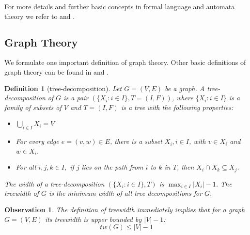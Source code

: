 \documentclass[]{article}
\newtheorem{definition}[theorem]{Definition}
\newtheorem{observation}[theorem]{Observation}
\numberwithin{equation}{section}
\begin{document}
For more details and further basic concepts in formal language and automata theory we refer to \cite{HMU06} and \cite{Sch08}.

\subsection{Graph Theory}
\label{sec:def:graph}

We formulate one important definition of graph theory. Other basic definitions of graph theory can be found in \cite{KN12} and \cite{Die06}.

\begin{definition}[tree-decomposition]
	\label{def:treedecomp}
	Let $G = (V,E)$ be a graph. A tree-decomposition of $G$ is a pair $(\{X_i : i \in I\}, T = (I,F))$, where $\{X_i : i \in I\}$ is a family of subsets of $V$ and $T = (I,F)$ is a tree with the following properties:
	\begin{itemize}
		\item[(i)] $\bigcup_{i \in I} X_i = V$
		\item[(ii)] For every edge $e = (v,w) \in E$, there is a subset $X_i, i \in I$, with $v	\in X_i$ and $w \in X_i$.
		\item[(iii)] For all $i, j, k \in I,$ if $j$ lies on the path from $i$ to $k$ in $T$, then $X_i\cap X_k \subseteq X_j$.
	\end{itemize}
	The width of a tree-decomposition $(\{X_i : i \in I\}, T)$ is $\max_{i \in I} |X_i|-1$. The treewidth of $G$ is the minimum width of all tree decompositions for $G$.
\end{definition}

\begin{observation}
	\label{obs:treewidth}
	The definition of treewidth immediately implies that for a graph $G=(V,E)$ its treewidth is upper bounded by $|V|-1$:
	$$tw(G) \leq |V|-1$$
\end{observation}
\end{document}
